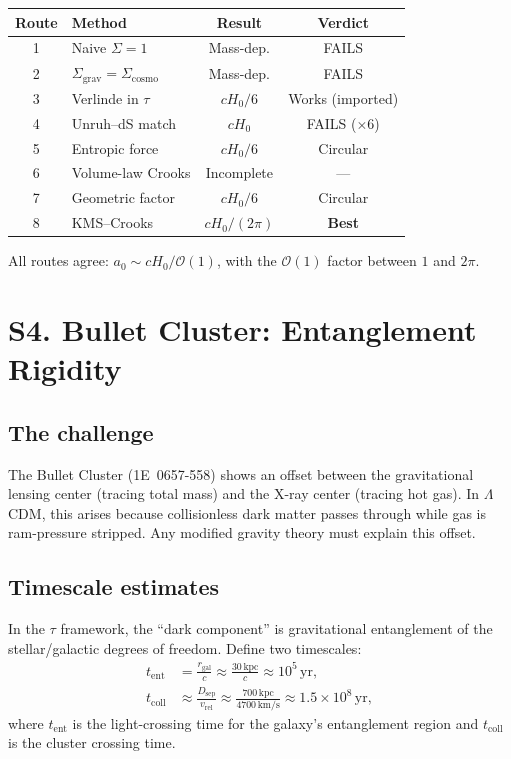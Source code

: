 \documentclass[aps,prd,preprint,superscriptaddress,longbibliography]{revtex4-2}
\newcommand{\tauasym}{\tau}
\newcommand{\azero}{a_0}
\begin{document}
\begin{center}
\begin{tabular}{clcc}
\toprule
Route & Method & Result & Verdict \\
\midrule
1 & Naive $\Sigma=1$ & Mass-dep. & FAILS \\
2 & $\Sigma_{\mathrm{grav}}=\Sigma_{\mathrm{cosmo}}$ & Mass-dep. & FAILS \\
3 & Verlinde in $\tauasym$ & $cH_0/6$ & Works (imported) \\
4 & Unruh--dS match & $cH_0$ & FAILS ($\times 6$) \\
5 & Entropic force & $cH_0/6$ & Circular \\
6 & Volume-law Crooks & Incomplete & --- \\
7 & Geometric factor & $cH_0/6$ & Circular \\
8 & KMS--Crooks & $cH_0/(2\pi)$ & \textbf{Best} \\
\bottomrule
\end{tabular}
\end{center}

All routes agree: $\azero \sim cH_0/\mathcal{O}(1)$, with the
$\mathcal{O}(1)$ factor between $1$ and $2\pi$.

\section{S4. Bullet Cluster: Entanglement Rigidity}
\label{sec:bullet}

\subsection{The challenge}

The Bullet Cluster (1E~0657-558) shows an offset between the
gravitational lensing center (tracing total mass) and the X-ray
center (tracing hot gas).  In $\Lambda$CDM, this arises because
collisionless dark matter passes through while gas is ram-pressure
stripped.  Any modified gravity theory must explain this offset.

\subsection{Timescale estimates}

In the $\tauasym$ framework, the ``dark component'' is
gravitational entanglement of the stellar/galactic degrees of
freedom.  Define two timescales:
\begin{align}
t_{\mathrm{ent}} &= \frac{r_{\mathrm{gal}}}{c}
\approx \frac{30\,\mathrm{kpc}}{c}
\approx 10^5\,\mathrm{yr},
\label{eq:t_ent}\\
t_{\mathrm{coll}} &\approx \frac{D_{\mathrm{sep}}}{v_{\mathrm{rel}}}
\approx \frac{700\,\mathrm{kpc}}{4700\,\mathrm{km/s}}
\approx 1.5\times 10^8\,\mathrm{yr},
\label{eq:t_coll}
\end{align}
where $t_{\mathrm{ent}}$ is the light-crossing time for the galaxy's
entanglement region and $t_{\mathrm{coll}}$ is the cluster crossing
time.
\end{document}
